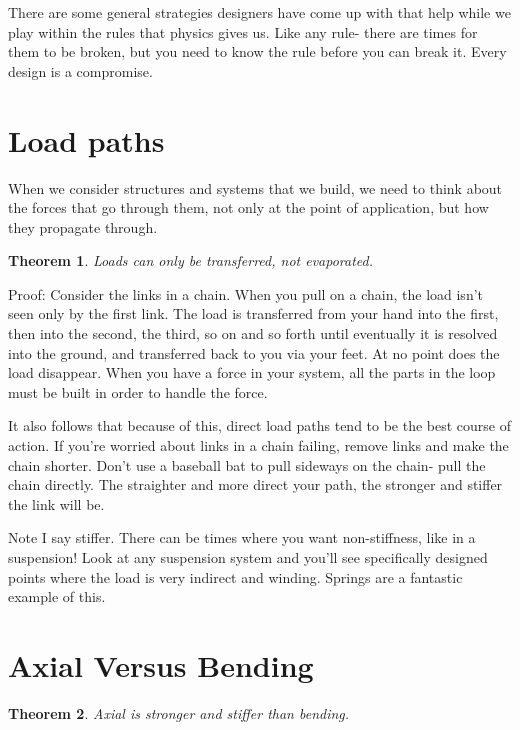 \documentclass[10pt,letterpaper]{book}
\newtheorem{theorem}{Theorem}
\begin{document}
There are some general strategies designers have come up with that help while we play within the rules that physics gives us. Like any rule- there are times for them to be broken, but you need to know the rule before you can break it. Every design is a compromise.

\section{Load paths}

When we consider structures and systems that we build, we need to think about the forces that go through them, not only at the point of application, but how they propagate through.

\begin{theorem} \label{theorem:load_paths}
	Loads can only be transferred, not evaporated.
\end{theorem}

Proof: Consider the links in a chain. When you pull on a chain, the load isn't seen only by the first link. The load is transferred from your hand into the first, then into the second, the third, so on and so forth until eventually it is resolved into the ground, and transferred back to you via your feet. At no point does the load disappear. When you have a force in your system, all the parts in the loop must be built in order to handle the force.

It also follows that because of this, direct load paths tend to be the best course of action. If you're worried about links in a chain failing, remove links and make the chain shorter. Don't use a baseball bat to pull sideways on the chain- pull the chain directly. The straighter and more direct your path, the stronger and stiffer the link will be.

Note I say stiffer. There can be times where you want non-stiffness, like in a suspension! Look at any suspension system and you'll see specifically designed points where the load is very indirect and winding. Springs are a fantastic example of this.

\section{Axial Versus Bending}

\begin{theorem} \label{theorem:axial_bending}
	Axial is stronger and stiffer than bending.
\end{theorem}
\end{document}
